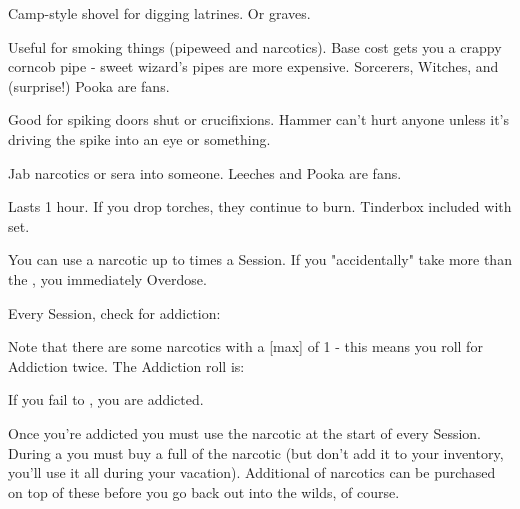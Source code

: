 {\begin{multicols}{2}
   Camp-style shovel for digging latrines.  Or graves.
  
   Useful for smoking things (pipeweed and narcotics). Base cost gets you a crappy corncob pipe - sweet wizard's pipes are more expensive.  Sorcerers, Witches, and (surprise!) Pooka are fans.
  
   Good for spiking doors shut or crucifixions.  Hammer can't hurt anyone unless it's driving the spike into an eye or something.
  
   Jab narcotics or sera into someone.  Leeches and Pooka are fans.
  
   Lasts 1 hour. If you drop torches, they continue to burn.  Tinderbox included with set.





  \newpage



You can use a narcotic up to \MAX times a Session. If you "accidentally" take more than the \MAX, you immediately Overdose.



   Every Session, check for addiction:
 


Note that there are some narcotics with a [max] of 1 - this means you roll for Addiction twice. The Addiction roll is:


  If you fail to \RO, you are addicted.  

  Once you're addicted you must use the narcotic at the start of every Session.  During a  you must buy a full \UD of the narcotic (but don't add it to your inventory, you'll use it all during your vacation).  Additional \UD of narcotics can be purchased on top of these before you go back out into the wilds, of course.


\end{multicols}}
